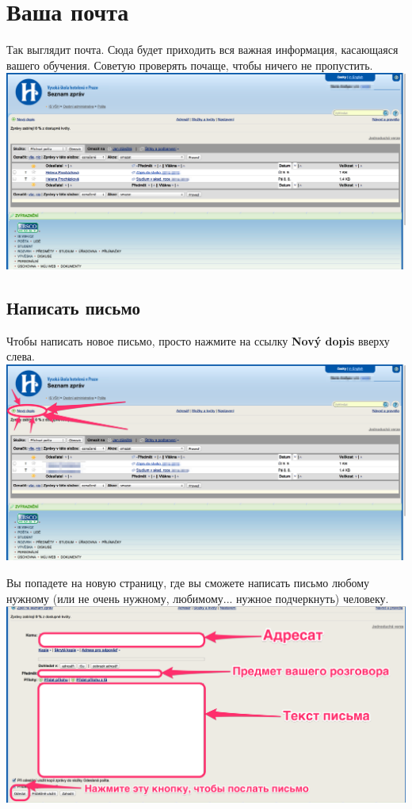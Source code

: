 \documentclass[a4paper,12pt]{article}
\begin{document}
\newpage

\section{Ваша почта}
Так выглядит почта. Сюда будет приходить вся важная информация, касающаяся вашего обучения.
Советую проверять почаще, чтобы ничего не пропустить. \\

\includegraphics[width=\textwidth]{s08}

\subsection{Написать письмо}

Чтобы написать новое письмо, просто нажмите на ссылку \textbf{Nový dopis} вверху слева. \\

\includegraphics[width=\textwidth]{s09}

\newpage
Вы попадете на новую страницу, где вы сможете написать письмо любому нужному 
(или не очень нужному, любимому... нужное подчеркнуть) человеку. \\

\includegraphics[width=\textwidth]{s10} \\
\end{document}
